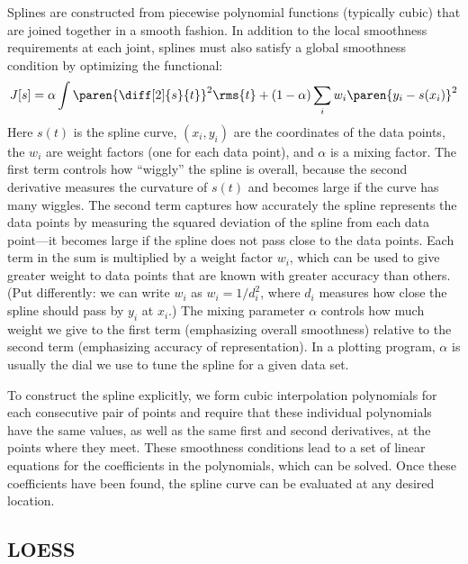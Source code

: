 Splines are constructed from piecewise polynomial functions  (typically
cubic) that are joined together in a smooth fashion. In addition to
the local smoothness requirements at each joint, splines must also
satisfy a global smoothness condition by optimizing the functional:\vspace*{-3pt}
%
\[
J[s] = \alpha \int \paren{ \diff[2]{s}{t} }^2 \rms{t}
     + (1-\alpha) \sum_i w_i \paren{ y_i - s(x_i) }^2\vspace*{-3pt}
\]
%
Here $s(t)$ is the spline curve, $(x_i, y_i)$ are the coordinates of
the data points, the $w_i$ are weight factors (one for each data
point), and $\alpha$ is a mixing factor. The first term controls how
``wiggly'' the spline is overall, because the second derivative
measures the curvature of $s(t)$ and becomes large if the curve has
many wiggles. The second term captures how accurately the spline
represents the data points by measuring the squared deviation of the
spline from each data point---it becomes large if the spline does not
pass close to the data points.  Each term in the sum is multiplied by
a weight factor $w_i$, which can be used to give greater weight to
data points that are known with greater accuracy than others. (Put
differently: we can write $w_i$ as $w_i = 1/d_i^2$, where $d_i$
measures how close the spline should pass by $y_i$ at $x_i$.) The
mixing parameter $\alpha$ controls how much weight we give to the
first term (emphasizing overall smoothness) relative to the second
term (emphasizing accuracy of representation).  In a plotting program,
$\alpha$ is usually the dial we use to tune the spline for a given
data set.

To construct the spline explicitly, we form cubic interpolation
polynomials for each consecutive pair of points and require that
these individual polynomials have the same values, as well as the same
first and second derivatives, at the points where they meet. These
smoothness conditions lead to a set of linear equations for the
coefficients in the polynomials, which can be solved. Once these
coefficients have been found, the spline curve can be evaluated at any
desired location.

\subsection{LOESS}

  
